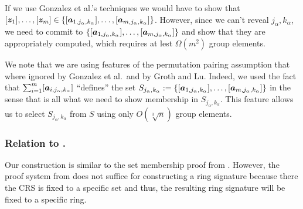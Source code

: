 If we use Gonzalez et al.'s techniques we would have to show that $[{\boldsymbol{z}}_1],\ldots,\allowbreak [{\boldsymbol{z}}_m]\in\{[{\boldsymbol{a}}_{1,j_\alpha,k_\alpha}],\ldots,[{\boldsymbol{a}}_{m,j_\alpha,k_\alpha}]\}$. However, since we can't reveal $j_\alpha,k_\alpha$, we need to commit to $\{[{\boldsymbol{a}}_{1,j_\alpha,k_\alpha}],\ldots,[{\boldsymbol{a}}_{m,j_\alpha,k_\alpha}]\}$ and show that they are appropriately computed, which requires at lest $\Omega(m^2)$ group elements.

We note that we are using features of the permutation pairing assumption that where ignored by Gonzalez et al.~and by Groth and Lu. Indeed, we used the fact that $\sum_{i=1}^m [{\boldsymbol{a}}_{i,j_\alpha,k_\alpha}]$ ``defines'' the set $S_{j_\alpha,k_\alpha}:=\{[{\boldsymbol{a}}_{1,j_\alpha,k_\alpha}],\ldots,[{\boldsymbol{a}}_{m,j_\alpha,k_\alpha}]\}$ in the sense that is all what we need to show membership in $S_{j_\alpha,k_\alpha}$. This feature allows us to select $S_{j_\alpha,k_\alpha}$ from $S$ using only $O(\sqrt[3]{n})$ group elements.



\subsubsection{Relation to \cite{AC:GonHevRaf15}.}
Our construction is similar to the set membership proof from \cite{AC:GonHevRaf15}. However, the proof system from \cite{AC:GonHevRaf15} does not suffice for constructing a ring signature because there the CRS is fixed to a specific set and thus, the resulting ring signature will be fixed to a specific ring. 


